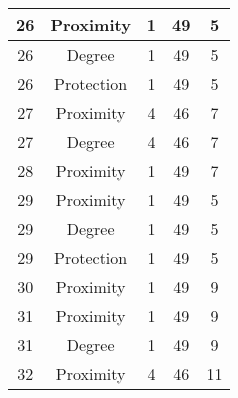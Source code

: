 \documentclass[results.tex]{subfiles}
\begin{document}
\begin{center}
\begin{tabular}{| c || c | c | c | c |}
            \hline
            26                      & Proximity                    & 1                      & 49                      & 5                    \\
            \hline
            26                      & Degree                       & 1                      & 49                      & 5                    \\
            \hline
            26                      & Protection                   & 1                      & 49                      & 5                    \\
            \hline
            27                      & Proximity                    & 4                      & 46                      & 7                    \\
            \hline
            27                      & Degree                       & 4                      & 46                      & 7                    \\
            \hline
            28                      & Proximity                    & 1                      & 49                      & 7                    \\
            \hline
            29                      & Proximity                    & 1                      & 49                      & 5                    \\
            \hline
            29                      & Degree                       & 1                      & 49                      & 5                    \\
            \hline
            29                      & Protection                   & 1                      & 49                      & 5                    \\
            \hline
            30                      & Proximity                    & 1                      & 49                      & 9                    \\
            \hline
            31                      & Proximity                    & 1                      & 49                      & 9                    \\
            \hline
            31                      & Degree                       & 1                      & 49                      & 9                    \\
            \hline
            32                      & Proximity                    & 4                      & 46                      & 11                   \\

\end{tabular}
\end{center}
\end{document}
